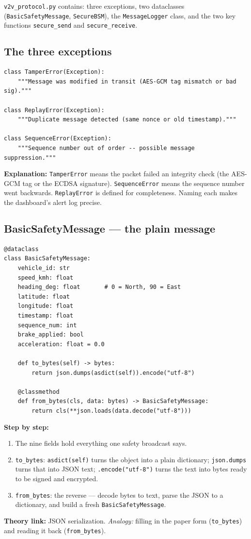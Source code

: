 \documentclass[11pt,a4paper]{report}
\begin{document}
\texttt{v2v\_protocol.py} contains: three exceptions, two dataclasses
(\texttt{BasicSafetyMessage}, \texttt{SecureBSM}), the \texttt{MessageLogger}
class, and the two key functions \texttt{secure\_send} and
\texttt{secure\_receive}.

\subsection{The three exceptions}
\begin{lstlisting}[style=py,caption={v2v\_protocol.py --- the messaging exceptions.}]
class TamperError(Exception):
    """Message was modified in transit (AES-GCM tag mismatch or bad sig)."""

class ReplayError(Exception):
    """Duplicate message detected (same nonce or old timestamp)."""

class SequenceError(Exception):
    """Sequence number out of order -- possible message suppression."""
\end{lstlisting}
\textbf{Explanation:} \texttt{TamperError} means the packet failed an integrity
check (the AES-GCM tag or the ECDSA signature). \texttt{SequenceError} means the
sequence number went backwards. \texttt{ReplayError} is defined for completeness.
Naming each makes the dashboard's alert log precise.

\subsection{BasicSafetyMessage --- the plain message}
\begin{lstlisting}[style=py,caption={v2v\_protocol.py --- the BasicSafetyMessage dataclass.}]
@dataclass
class BasicSafetyMessage:
    vehicle_id: str
    speed_kmh: float
    heading_deg: float       # 0 = North, 90 = East
    latitude: float
    longitude: float
    timestamp: float
    sequence_num: int
    brake_applied: bool
    acceleration: float = 0.0

    def to_bytes(self) -> bytes:
        return json.dumps(asdict(self)).encode("utf-8")

    @classmethod
    def from_bytes(cls, data: bytes) -> BasicSafetyMessage:
        return cls(**json.loads(data.decode("utf-8")))
\end{lstlisting}
\textbf{Step by step:}
\begin{enumerate}
  \item The nine fields hold everything one safety broadcast says.
  \item \texttt{to\_bytes}: \texttt{asdict(self)} turns the object into a plain
        dictionary; \texttt{json.dumps} turns that into JSON text;
        \texttt{.encode("utf-8")} turns the text into bytes ready to be signed
        and encrypted.
  \item \texttt{from\_bytes}: the reverse --- decode bytes to text, parse the
        JSON to a dictionary, and build a fresh \texttt{BasicSafetyMessage}.
\end{enumerate}
\textbf{Theory link:} JSON serialization. \emph{Analogy:} filling in the paper
form (\texttt{to\_bytes}) and reading it back (\texttt{from\_bytes}).
\end{document}
